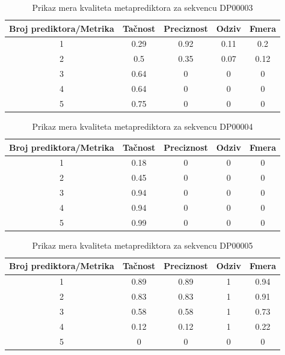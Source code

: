 \begin{table}[H]
\centering
 \begin{tabular}{||c c c c c||} 
 \hline
 Broj prediktora/Metrika & Tačnost & Preciznost & Odziv & Fmera\\ [0.5ex] 
 \hline\hline
 1 & 0.29 & 0.92 & 0.11 & 0.2 \\ 
 \hline
 2 & 0.5 & 0.35 & 0.07 & 0.12 \\
 \hline
 3 & 0.64 & 0 & 0 & 0 \\
 \hline
 4 & 0.64 & 0 & 0 & 0\\
 \hline
 5 & 0.75 & 0 & 0 & 0\\ [1ex] 
 \hline
\end{tabular}
\caption{Prikaz mera kvaliteta metaprediktora za sekvencu DP00003}
\label{table:2}
\end{table}

\begin{table}[H]
\centering
 \begin{tabular}{||c c c c c||} 
 \hline
 Broj prediktora/Metrika & Tačnost & Preciznost & Odziv & Fmera\\ [0.5ex] 
 \hline\hline
 1 & 0.18 & 0 & 0 & 0 \\ 
 \hline
 2 & 0.45 & 0 & 0 & 0 \\
 \hline
 3 & 0.94 & 0 & 0 & 0 \\
 \hline
 4 & 0.94 & 0 & 0 & 0\\
 \hline
 5 & 0.99 & 0 & 0 & 0\\ [1ex] 
 \hline
\end{tabular}
\caption{Prikaz mera kvaliteta metaprediktora za sekvencu DP00004}
\label{table:5}
\end{table}

\begin{table}[H]
\centering
 \begin{tabular}{||c c c c c||} 
 \hline
 Broj prediktora/Metrika & Tačnost & Preciznost & Odziv & Fmera\\ [0.5ex] 
 \hline\hline
 1 & 0.89 & 0.89 & 1 & 0.94\\ 
 \hline
 2 & 0.83 & 0.83 & 1 & 0.91 \\
 \hline
 3 & 0.58 & 0.58 & 1 & 0.73 \\
 \hline
 4 & 0.12 & 0.12 & 1 & 0.22\\
 \hline
 5 & 0 & 0 & 0 & 0\\ [1ex] 
 \hline
\end{tabular}
\caption{Prikaz mera kvaliteta metaprediktora za sekvencu DP00005}
\label{table:3}
\end{table}
\newpage

